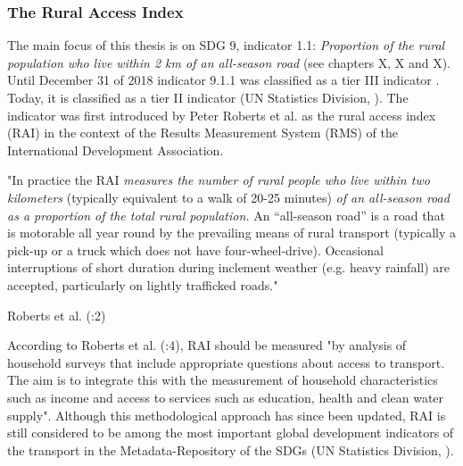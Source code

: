 	            \medskip
	            
	            
	            

	       \subsubsection{The Rural Access Index}
	            
	            The main focus of this thesis is on SDG 9, indicator 1.1: \textit{Proportion of the rural population who live within 2 km of an all-season road} (see chapters X, X and X). Until December 31 of 2018 indicator 9.1.1 was classified as a tier III indicator \citep{sdsn2015}. Today, it is classified as a tier II indicator (UN Statistics Division, \citeyear{unitednationsstatisticsdivision2019b}). The indicator was first introduced by Peter Roberts et al. \citeyear{roberts2006} as the rural access index (RAI) in the context of the Results Measurement System (RMS) of the International Development Association. 
	            
	            \medskip
	            
	             \begin{tcolorbox}
    				
    				"In practice the RAI \textit{measures the number of rural people who live within two kilometers} (typically equivalent to a walk of 20-25 minutes) \textit{of an all-season road as a proportion of the total rural population.} An “all-season road” is a road that is motorable all year round by the prevailing means of rural transport (typically a pick-up or a truck which does not have four-wheel-drive). Occasional interruptions of short duration during inclement weather (e.g. heavy rainfall) are accepted, particularly on lightly trafficked roads."
    				
    				\begin{center}
    				    Roberts et al. (\citeyear{roberts2006}:2)
    				\end{center}
			    \end{tcolorbox}

	            \medskip
                
                According to Roberts et al. (\citeyear{roberts2006}:4), RAI should be measured "by analysis of household surveys that include appropriate questions about access to transport. The aim is to integrate this with the measurement of household characteristics such as income and access to services such as education, health and clean water supply". Although this methodological approach has since been updated, RAI is still considered to be among the most important global development indicators of the transport in the Metadata-Repository of the SDGs (UN Statistics Division, \citeyear{unitednationsstatisticsdivision2019a}). 
                
